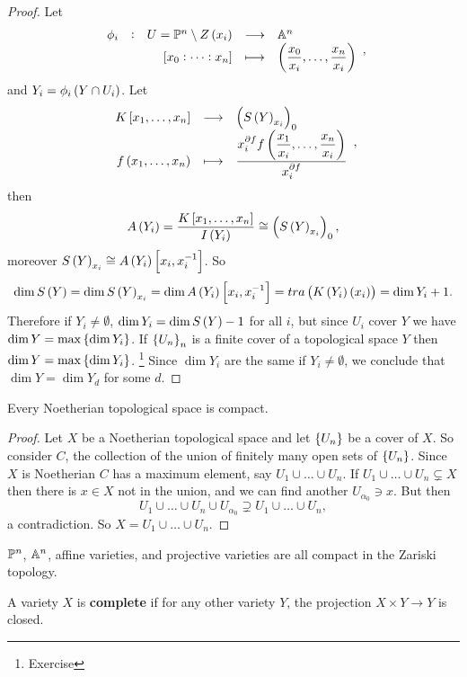 \begin{proof}
Let
$$ \function[\phi_i]{U = \PP^n \setminus Z\br{x_i}}{\AA^n}{\sbr{x_0 : \dots : x_n}}{\br{\dfrac{x_0}{x_i}, \dots, \dfrac{x_n}{x_i}}}, $$
and $ Y_i = \phi_i\br{Y \cap U_i} $. Let
$$ \function{K\sbr{x_1, \dots, x_n}}{\br{S\br{Y}_{x_i}}_0}{f\br{x_1, \dots, x_n}}{\dfrac{x_i^{\partial f}f\br{\dfrac{x_1}{x_i}, \dots, \dfrac{x_n}{x_i}}}{x_i^{\partial f}}}, $$
then
$$ A\br{Y_i} = \dfrac{K\sbr{x_1, \dots, x_n}}{I\br{Y_i}} \cong \br{S\br{Y}_{x_i}}_0, $$
moreover $ S\br{Y}_{x_i} \cong A\br{Y_i}\sbr{x_i, x_i^{-1}} $. So
$$ \dim S\br{Y} = \dim S\br{Y}_{x_i} = \dim A\br{Y_i}\sbr{x_i, x_i^{-1}} = tra\br{K\br{Y_i}\br{x_i}} = \dim Y_i + 1. $$
Therefore if $ Y_i \ne \emptyset $, $ \dim Y_i = \dim S\br{Y} - 1 $ for all $ i $, but since $ U_i $ cover $ Y $ we have $ \dim Y = \max\cbr{\dim Y_i} $. If $ \cbr{U_n}_n $ is a finite cover of a topological space $ Y $ then $ \dim Y = \max\cbr{\dim Y_i} $. \footnote{Exercise} Since $ \dim Y_i $ are the same if $ Y_i \ne \emptyset $, we conclude that $ \dim Y = \dim Y_d $ for some $ d $.
\end{proof}


\begin{proposition}
Every Noetherian topological space is compact.
\end{proposition}

\begin{proof}
Let $ X $ be a Noetherian topological space and let $ \cbr{U_n} $ be a cover of $ X $. So consider $ C $, the collection of the union of finitely many open sets of $ \cbr{U_n} $. Since $ X $ is Noetherian $ C $ has a maximum element, say $ U_1 \cup \dots \cup U_n $. If $ U_1 \cup \dots \cup U_n \subsetneq X $ then there is $ x \in X $ not in the union, and we can find another $ U_{\alpha_0} \ni x $. But then
$$ U_1 \cup \dots \cup U_n \cup U_{\alpha_0} \supsetneq U_1 \cup \dots \cup U_n, $$
a contradiction. So $ X = U_1 \cup \dots \cup U_n $.
\end{proof}

\begin{corollary}
$ \PP^n $, $ \AA^n $, affine varieties, and projective varieties are all compact in the Zariski topology.
\end{corollary}

\begin{definition}
A variety $ X $ is \textbf{complete} if for any other variety $ Y $, the projection $ X \times Y \to Y $ is closed.
\end{definition}

